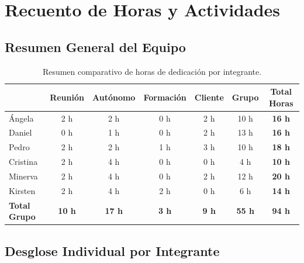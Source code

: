 



\section{Recuento de Horas y Actividades}

\subsection{Resumen General del Equipo}

\begin{table}[H]
\centering
\small
\begin{tabularx}{\textwidth}{X c c c c c c}
\toprule
 & \textbf{Reunión} & \textbf{Autónomo} & \textbf{Formación} & \textbf{Cliente} & \textbf{Grupo} & \textbf{Total Horas} \\
\midrule
Ángela    & 2 h  & 2 h  & 0 h & 2 h & 10 h & \textbf{16 h} \\
Daniel    & 0 h  & 1 h  & 0 h & 2 h & 13 h & \textbf{16 h} \\
Pedro     & 2 h  & 2 h  & 1 h & 3 h & 10 h & \textbf{18 h} \\
Cristina  & 2 h  & 4 h  & 0 h & 0 h & 4 h  & \textbf{10 h} \\
Minerva   & 2 h  & 4 h  & 0 h & 2 h & 12 h & \textbf{20 h} \\
Kirsten   & 2 h  & 4 h  & 2 h & 0 h & 6 h  & \textbf{14 h} \\
\midrule
\textbf{Total Grupo} & \textbf{10 h} & \textbf{17 h} & \textbf{3 h} & \textbf{9 h} & \textbf{55 h} & \textbf{94 h} \\
\bottomrule
\end{tabularx}
\caption{Resumen comparativo de horas de dedicación por integrante.}
\label{tab:resumen-general}
\end{table}
\newpage
\subsection{Desglose Individual por Integrante}

